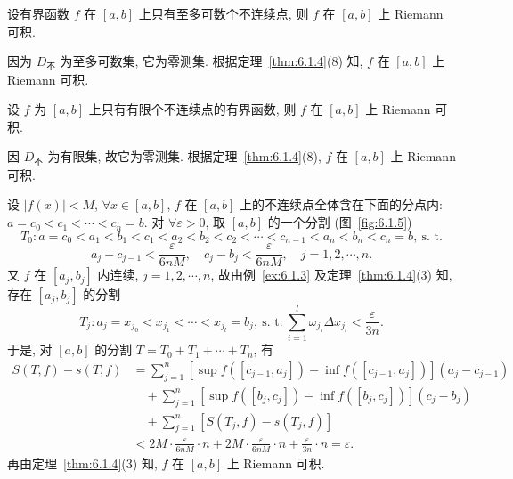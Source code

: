 \begin{example}\label{ex:6.1.4}
设有界函数 $f$ 在 $[a,b]$ 上只有至多可数个不连续点, 则 $f$ 在 $[a,b]$ 上 Riemann 可积.
\end{example}

\begin{solution}
因为 $D_{\text{不}}$ 为至多可数集, 它为零测集. 根据定理~\ref{thm:6.1.4}(8) 知, $f$ 在 $[a,b]$ 上 Riemann 可积.
\end{solution}

\begin{example}\label{ex:6.1.5}
设 $f$ 为 $[a,b]$ 上只有有限个不连续点的有界函数, 则 $f$ 在 $[a,b]$ 上 Riemann 可积.
\end{example}

\begin{solution}[证法 1]
因 $D_{\text{不}}$ 为有限集, 故它为零测集. 根据定理~\ref{thm:6.1.4}(8), $f$ 在 $[a,b]$ 上 Riemann 可积.
\end{solution}

\begin{solution}[证法 2]
设 $|f(x)|<M$, $\forall x\in[a,b]$, $f$ 在 $[a,b]$ 上的不连续点全体含在下面的分点内: $a=c_{0}<c_{1}<\cdots<c_{n}=b$. 对 $\forall\varepsilon>0$, 取 $[a,b]$ 的一个分割 (图~\ref{fig:6.1.5})
\[
T_{0}: a=c_{0}<a_{1}<b_{1}<c_{1}<a_{2}<b_{2}<c_{2}<\cdots<c_{n-1}<a_{n}<b_{n}<c_{n}=b,\ \text{s. t.}
\]
\[
a_{j}-c_{j-1}<\frac{\varepsilon}{6nM},\quad c_{j}-b_{j}<\frac{\varepsilon}{6nM},\quad j=1,2,\cdots,n.
\]
又 $f$ 在 $[a_{j},b_{j}]$ 内连续, $j=1,2,\cdots,n$, 故由例~\ref{ex:6.1.3} 及定理~\ref{thm:6.1.4}(3) 知, 存在 $[a_{j},b_{j}]$ 的分割
\[
T_{j}: a_{j}=x_{j_{0}}<x_{j_{1}}<\cdots<x_{j_{l}}=b_{j},\ \text{s. t.}\ \sum_{i=1}^{l}\omega_{j_{i}}\Delta x_{j_{i}}<\frac{\varepsilon}{3n}.
\]
于是, 对 $[a,b]$ 的分割 $T=T_{0}+T_{1}+\cdots+T_{n}$, 有
\begin{align*}
S(T,f)-s(T,f)&=\sum_{j=1}^{n}\left[\sup f([c_{j-1},a_{j}])-\inf f([c_{j-1},a_{j}])\right](a_{j}-c_{j-1})\\
&\quad+\sum_{j=1}^{n}\left[\sup f([b_{j},c_{j}])-\inf f([b_{j},c_{j}])\right](c_{j}-b_{j})\\
&\quad+\sum_{j=1}^{n}\left[S(T_{j},f)-s(T_{j},f)\right]\\
&<2M\cdot\frac{\varepsilon}{6nM}\cdot n+2M\cdot\frac{\varepsilon}{6nM}\cdot n+\frac{\varepsilon}{3n}\cdot n=\varepsilon.
\end{align*}
再由定理~\ref{thm:6.1.4}(3) 知, $f$ 在 $[a,b]$ 上 Riemann 可积.
\end{solution}

